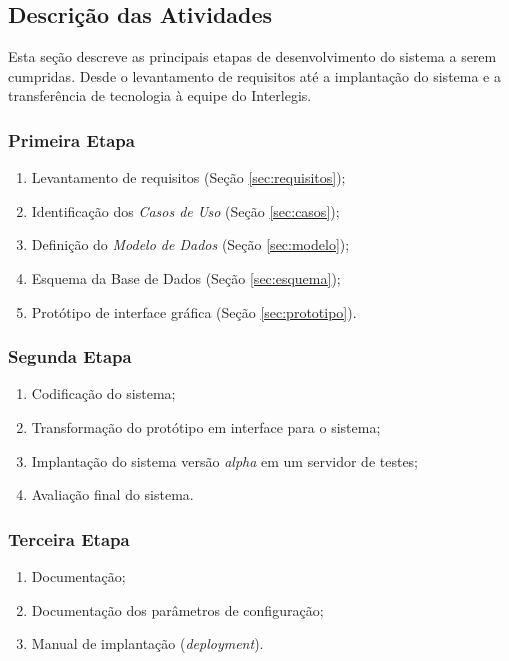 \subsection{Descrição das Atividades}
Esta seção descreve as principais etapas de desenvolvimento do sistema
a serem cumpridas. Desde o levantamento de requisitos até a
implantação do sistema e a transferência de tecnologia à equipe do
Interlegis.

\subsubsection{Primeira Etapa}
\begin{enumerate}
\item Levantamento de requisitos (Seção \ref{sec:requisitos});
\item Identificação dos \emph{Casos de Uso} (Seção \ref{sec:casos});
\item Definição do \emph{Modelo de Dados} (Seção \ref{sec:modelo});
\item Esquema da Base de Dados (Seção \ref{sec:esquema});
\item Protótipo de interface gráfica (Seção \ref{sec:prototipo}).
\end{enumerate}

\subsubsection{Segunda Etapa}
\begin{enumerate}
\item Codificação do sistema;
\item Transformação do protótipo em interface para o sistema;
\item Implantação do sistema versão \textit{alpha} em um servidor de
  testes;
\item Avaliação final do sistema.
\end{enumerate}

\subsubsection{Terceira Etapa}
\begin{enumerate}
\item Documentação;
\item Documentação dos parâmetros de configuração;
\item Manual de implantação (\textit{deployment}).
\end{enumerate}

